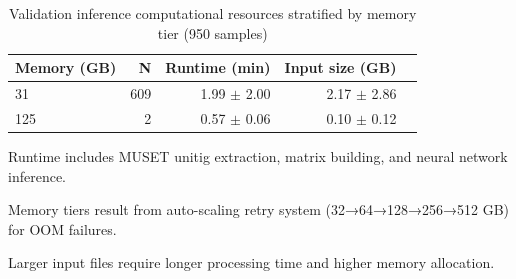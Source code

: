 \begin{table}[!t]
\centering
\caption{Validation inference computational resources stratified by memory tier (950 samples)}
\label{tab:resources}
\begin{tabular}{lrrrr}
\toprule
Memory (GB) & N & Runtime (min) & Input size (GB) \\
\midrule
31 & 609 & 1.99 $\pm$ 2.00 & 2.17 $\pm$ 2.86 \\
125 & 2 & 0.57 $\pm$ 0.06 & 0.10 $\pm$ 0.12 \\
\bottomrule
\end{tabular}
\begin{tablenotes}
\item Runtime includes MUSET unitig extraction, matrix building, and neural network inference.
\item Memory tiers result from auto-scaling retry system (32→64→128→256→512 GB) for OOM failures.
\item Larger input files require longer processing time and higher memory allocation.
\end{tablenotes}
\end{table}